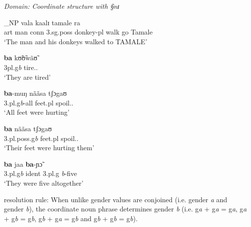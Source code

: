 \begin{exe}
  \ex\label{ex:all}{\it Domain: Coordinate structure with {\S nɪ}}\\
\begin{xlist}

\ex\label{ex:alla}

_{NP}  {vala}  {kaalɪ}  {tamale}
{ra}
\\
      {\sc art} {man} {\sc conn}  {\sc 3.sg.poss} {donkey-{\sc pl}} {walk}  {go}
{Tamale} {\foc} \\
\glt `The man and his donkeys walked to TAMALE' \\

\ex\label{ex:Tamanaphor}

\gll  \textbf{ba}  {kʊ̃ʊ̃wãʊ̃}  \\
       {{\sc 3pl}.{\sc g}{\it b}} tire.{\pfv}.{\foc}\\
\glt `They are tired' \\

\ex\label{ex:Tamquant}

\gll   \textbf{ba}-muŋ  {nããsa} {tʃɔgaʊ}  \\
       {3.{\sc pl}.{\sc g}{\it b}-all} {feet.{\sc pl}} spoil.{\pfv}.{\foc}\\
\glt `All  feet were hurting' \\

\ex\label{ex:Tamposs}

\gll     \textbf{ba}  {nããsa}  {tʃɔgaʊ}  \\
        {{\sc 3.pl.poss.g}{\it b}}  {feet.{\sc pl}}  spoil.{\pfv}.{\foc}\\
\glt `Their feet were hurting them' \\

\ex\label{ex:Tamnum}

\gll   \textbf{ba}  {jaa}    \textbf{ba}-ɲɔ̃  \\
        {{\sc 3.pl.g}{\it b}} {{\sc ident}}
{3.{\sc pl}.{\sc g}{\it
b}-five} \\
\glt `They were five altogether' \\


\ex\label{ex:rule}

{\sc resolution rule}: When unlike gender values are conjoined
(i.e. {\sc gender} {\it  a} and {\sc gender} {\it b}), the
coordinate noun phrase determines {\sc gender} {\it b} (i.e.
{\sc g}{\it a} + {\sc g}{\it a} = {\sc g}{\it a},
{\sc g}{\it a} + {\sc g}{\it b} = {\sc g}{\it b},
{\sc g}{\it b} + {\sc g}{\it a} = {\sc g}{\it b} and
{\sc g}{\it b} + {\sc g}{\it b} = {\sc g}{\it b}).



\end{xlist}
\end{exe}

